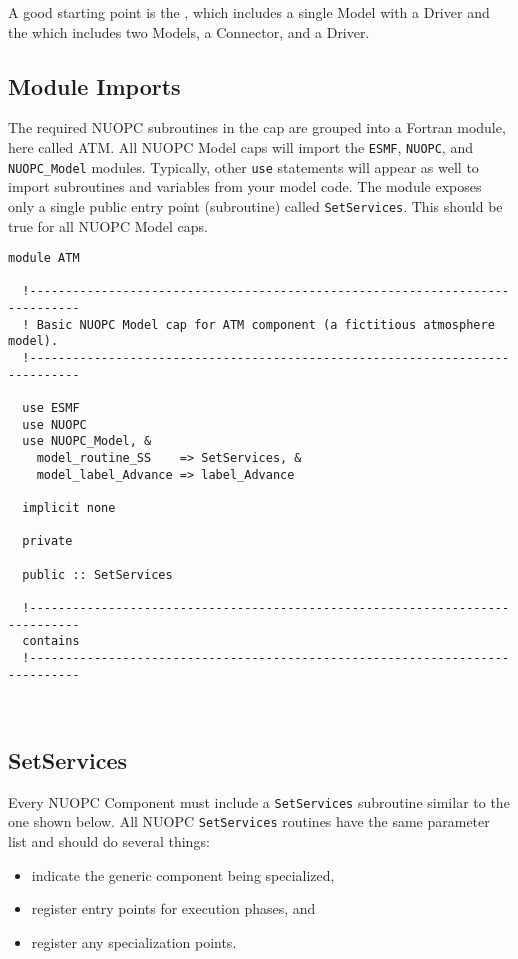    A good starting point is the
   ,
   which includes a single Model with a Driver and the
   which includes two Models, a Connector, and a Driver.
  
   \subsection{Module Imports}
   \label{sec:atmexample_moduleimports}
   The required NUOPC subroutines in the cap are grouped into a Fortran module,
   here called ATM.  All NUOPC Model caps will import the {\tt ESMF}, {\tt NUOPC}, and
   {\tt NUOPC\_Model} modules.  Typically, other {\tt use} statements will appear
   as well to import subroutines and variables from your model code. The module
   exposes only a single public entry point (subroutine) called {\tt SetServices}.
   This should be true for all NUOPC Model caps. 

 \begin{verbatim}
module ATM

  !-----------------------------------------------------------------------------
  ! Basic NUOPC Model cap for ATM component (a fictitious atmosphere model).
  !-----------------------------------------------------------------------------

  use ESMF
  use NUOPC
  use NUOPC_Model, &
    model_routine_SS    => SetServices, &
    model_label_Advance => label_Advance
  
  implicit none
  
  private
  
  public :: SetServices
  
  !-----------------------------------------------------------------------------
  contains
  !-----------------------------------------------------------------------------

 
\end{verbatim}
 

  \subsection{SetServices}
  \label{sec:atmexample_setservices}
   Every NUOPC Component must include a {\tt SetServices} subroutine similar to the one
   shown below.  All NUOPC {\tt SetServices} routines have the same parameter list
   and should do several things:
   \begin{itemize}
   \item indicate the generic component being specialized,
   \item register entry points for execution phases, and
   \item register any specialization points.
   \end{itemize}
  
